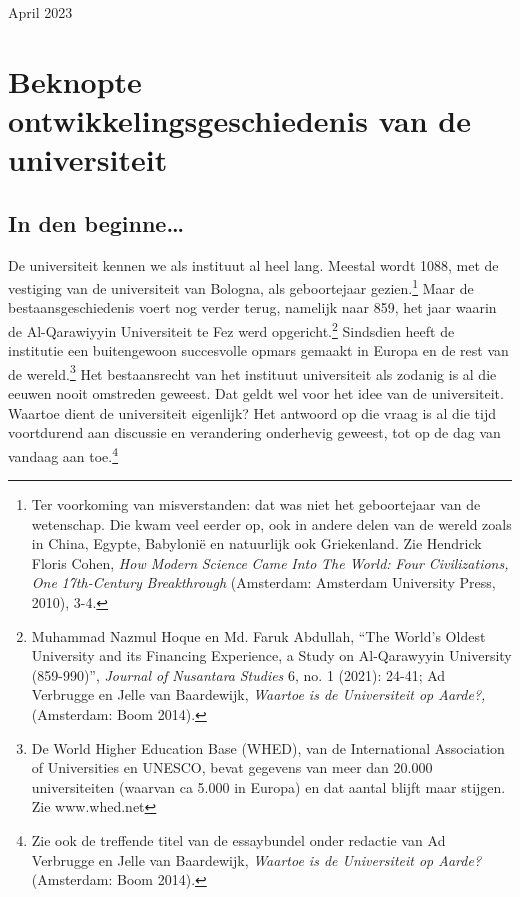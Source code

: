 \documentclass[smallauthor, chapterhaspagenum, nochapterinheader, pagenuminheader,  bigchapnum,medium2, tocpages,  garamond, titleinheader]{jote-book}
\begin{document}
	\noindent April 2023





	\chapter{Beknopte ontwikkelingsgeschiedenis van de universiteit }



	\section{In den beginne…}



	De universiteit kennen we als instituut al heel lang. Meestal wordt 1088, met de vestiging van de universiteit van Bologna, als geboortejaar gezien.\footnote{Ter voorkoming van misverstanden: dat was niet het geboortejaar van de wetenschap. Die kwam veel eerder op, ook in andere delen van de wereld zoals in China, Egypte, Babylonië en natuurlijk ook Griekenland. Zie Hendrick Floris Cohen, \emph{How Modern }\emph{Science}\emph{ }\emph{Came}\emph{ }\emph{Into}\emph{ The World: }\emph{Four}\emph{ }\emph{Civilizations}\emph{, }\emph{One}\emph{ 17th-Century }\emph{Breakthrough} (Amsterdam: Amsterdam University Press, 2010), 3-4.} Maar de bestaansgeschiedenis voert nog verder terug, namelijk naar 859, het jaar waarin de Al-Qarawiyyin Universiteit te Fez werd opgericht.\footnote{Muhammad Nazmul Hoque en Md. Faruk Abdullah, “The World's Oldest University and its Financing Experience, a Study on Al-Qarawyyin University (859-990)”, \emph{Journal of }\emph{Nusantara}\emph{ Studies}\emph{ }6, no. 1 (2021): 24-41; Ad Verbrugge en Jelle van Baardewijk, \emph{Waartoe is de Universiteit op Aarde?}\emph{, }(Amsterdam: Boom 2014).} Sindsdien heeft de institutie een buitengewoon succesvolle opmars gemaakt in Europa en de rest van de wereld.\footnote{De World Higher Education Base (WHED), van de International Association of Universities en UNESCO, bevat gegevens van meer dan 20.000 universiteiten (waarvan ca 5.000 in Europa) en dat aantal blijft maar stijgen. Zie www.whed.net} Het bestaansrecht van het instituut universiteit als zodanig is al die eeuwen nooit omstreden geweest. Dat geldt wel voor het idee van de universiteit. Waartoe dient de universiteit eigenlijk? Het antwoord op die vraag is al die tijd voortdurend aan discussie en verandering onderhevig geweest, tot op de dag van vandaag aan toe.\footnote{Zie ook de treffende titel van de essaybundel onder redactie van Ad Verbrugge en Jelle van Baardewijk, \emph{Waartoe is de Universiteit op Aarde?}\emph{ }(Amsterdam: Boom 2014).}
\end{document}

